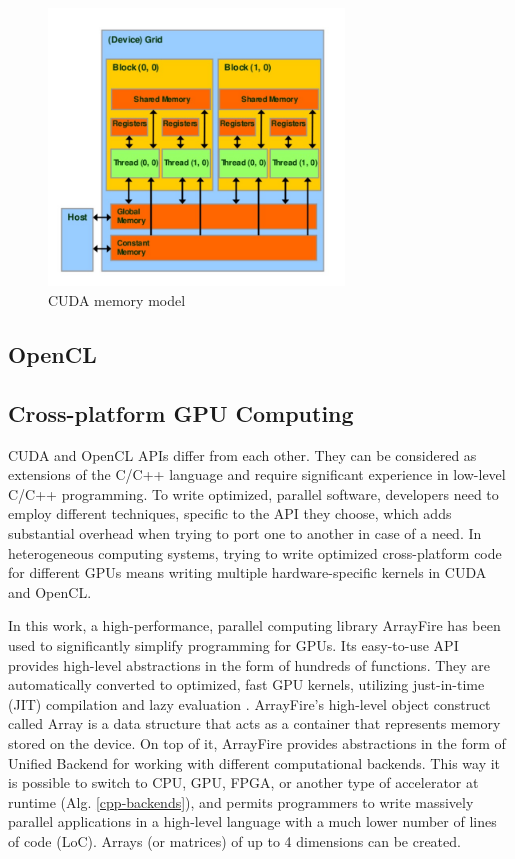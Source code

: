 \begin{figure}[!ht]
	\centering
	\includegraphics[width=0.7\textwidth]{figures/cuda-device-memory.jpg}
	\caption{CUDA memory model}
	\label{fig:cuda-memory-model}
\end{figure}

\subsection{OpenCL}

\subsection{Cross-platform GPU Computing}
\label{sec:computer-simulations-using-gpus}

CUDA and OpenCL APIs differ from each other. They can be considered as extensions of the C/C++ language and require significant experience in low-level C/C++ programming. To write optimized, parallel software, developers need to employ different techniques, specific to the API they choose, which adds substantial overhead when trying to port one to another in case of a need. In heterogeneous computing systems, trying to write optimized cross-platform code for different GPUs means writing multiple hardware-specific kernels in CUDA and OpenCL.

In this work, a high-performance, parallel computing library ArrayFire has been used to significantly simplify programming for GPUs. Its easy-to-use API provides high-level abstractions in the form of hundreds of functions. They are automatically converted to optimized, fast GPU kernels, utilizing just-in-time (JIT) compilation and lazy evaluation \cite{chrzeszczykMatrixComputationsGPU}. ArrayFire's high-level object construct called Array is a data structure that acts as a container that represents memory stored on the device. On top of it, ArrayFire provides abstractions in the form of Unified Backend for working with different computational backends. This way it is possible to switch to CPU, GPU, FPGA, or another type of accelerator at runtime \cite{Yalamanchili2015} (Alg. \ref{cpp-backends}), and permits programmers to write massively parallel applications in a high-level language with a much lower number of lines of code (LoC). Arrays (or matrices) of up to 4 dimensions can be created. 

